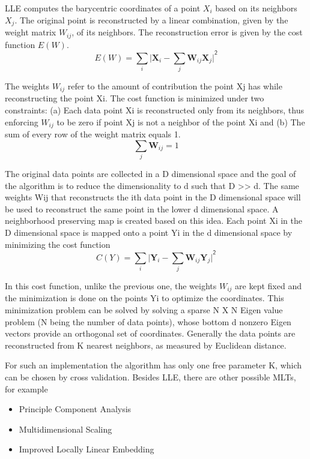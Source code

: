 \documentclass[12pt]{article} %
\begin{document}
LLE computes the barycentric coordinates of a point $X_i$ based on its neighbors $X_j$. The original point is reconstructed by a linear combination, given by the weight matrix $W_{ij}$, of its neighbors. The reconstruction error is given by the cost function $E(W)$.
\begin{equation}
	E(W) = \sum_i |{\mathbf{X}_i - \sum_j {\mathbf{W}_{ij}\mathbf{X}_j}|}^\mathsf{2} 
\end{equation}

The weights $W_{ij}$ refer to the amount of contribution the point Xj has while reconstructing the point Xi. The cost function is minimized under two constraints: (a) Each data point Xi is reconstructed only from its neighbors, thus enforcing $W_{ij}$ to be zero if point Xj is not a neighbor of the point Xi and (b) The sum of every row of the weight matrix equals 1.
\begin{equation}
	\sum_j {\mathbf{W}_{ij}} = 1 
\end{equation}

The original data points are collected in a D dimensional space and the goal of the algorithm is to reduce the dimensionality to d such that D >> d. The same weights Wij that reconstructs the ith data point in the D dimensional space will be used to reconstruct the same point in the lower d dimensional space. A neighborhood preserving map is created based on this idea. Each point Xi in the D dimensional space is mapped onto a point Yi in the d dimensional space by minimizing the cost function
\begin{equation}
	C(Y) = \sum_i |{\mathbf{Y}_i - \sum_j {\mathbf{W}_{ij}\mathbf{Y}_j}|}^\mathsf{2} 
\end{equation}

In this cost function, unlike the previous one, the weights $W_{ij}$ are kept fixed and the minimization is done on the points Yi to optimize the coordinates. This minimization problem can be solved by solving a sparse N X N Eigen value problem (N being the number of data points), whose bottom d nonzero Eigen vectors provide an orthogonal set of coordinates. Generally the data points are reconstructed from K nearest neighbors, as measured by Euclidean distance.

For such an implementation the algorithm has only one free parameter K, which can be chosen by cross validation. Besides LLE, there are other possible MLTs, for example
\begin{itemize}
  \item Principle Component Analysis 
  \item Multidimensional Scaling 
  \item Improved Locally Linear Embedding
\end{itemize}
\end{document}

